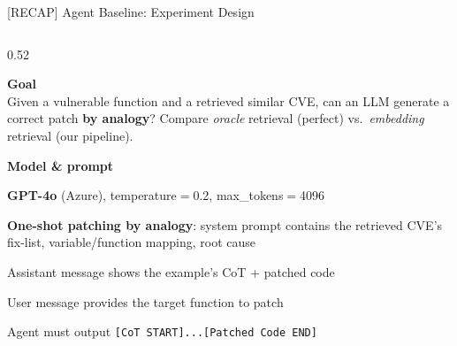 \documentclass[aspectratio=169,10pt]{beamer}
\begin{document}
\begin{frame}{[RECAP] Agent Baseline: Experiment Design}
\begin{columns}[T]
\begin{column}{0.52\textwidth}

  \textbf{Goal}\\[3pt]
  {\small Given a vulnerable function and a retrieved similar CVE,
  can an LLM generate a correct patch \textbf{by analogy}?
  Compare \textit{oracle} retrieval (perfect) vs.\ \textit{embedding} retrieval (our pipeline).}

  \vspace{0.6em}
  \textbf{Model \& prompt}
  \begin{itemize}\setlength{\itemsep}{2pt}
    {\scriptsize
    \item \textbf{GPT-4o} (Azure), temperature$=$0.2, max\_tokens$=$4096
    \item \textbf{One-shot patching by analogy}: system prompt contains the
          retrieved CVE's fix-list, variable/function mapping, root cause
    \item Assistant message shows the example's CoT + patched code
    \item User message provides the target function to patch
    \item Agent must output \texttt{[CoT START]...[Patched Code END]}}
  \end{itemize}

\end{column}
\end{columns}
\end{frame}
\end{document}
